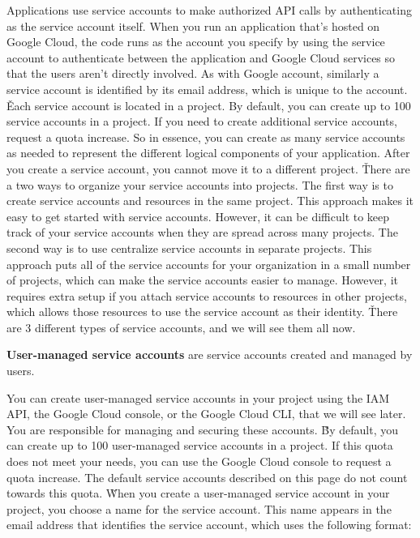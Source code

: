 Applications use service accounts to make authorized API calls by authenticating as the service account itself. When
you run an application that's hosted on Google Cloud, the code runs as the account you specify by using the service
account to authenticate between the application and Google Cloud services so that the users aren't directly involved.
As with Google account, similarly a service account is identified by its email address, which is unique to the
account. \v

Each service account is located in a project. By default, you can create up to 100 service accounts in a project. If
you need to create additional service accounts, request a quota increase. So in essence, you can create as many
service accounts as needed to represent the different logical components of your application. After you create a
service account, you cannot move it to a different project. \v

There are a two ways to organize your service accounts into projects. The first way is to create service accounts and
resources in the same project. This approach makes it easy to get started with service accounts. However, it can be
difficult to keep track of your service accounts when they are spread across many projects. The second way is to use
centralize service accounts in separate projects. This approach puts all of the service accounts for your
organization in a small number of projects, which can make the service accounts easier to manage. However, it
requires extra setup if you attach service accounts to resources in other projects, which allows those resources to
use the service account as their identity. \v

There are 3 different types of service accounts, and we will see them all now.

\textbf{User-managed service accounts} are service accounts created and managed by users.
\ed

You can create user-managed service accounts in your project using the IAM API, the Google Cloud console, or the
Google Cloud CLI, that we will see later. You are responsible for managing and securing these accounts. \v

By default, you can create up to 100 user-managed service accounts in a project. If this quota does not meet your
needs, you can use the Google Cloud console to request a quota increase. The default service accounts described on
this page do not count towards this quota. \v

When you create a user-managed service account in your project, you choose a name for the service account. This name
appears in the email address that identifies the service account, which uses the following format:


